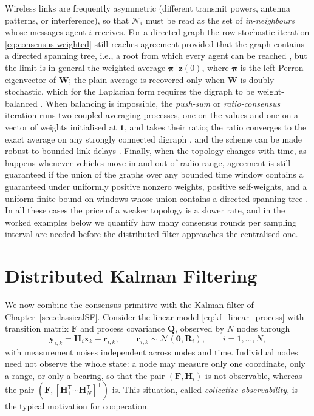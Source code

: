 \documentclass[graybox,envcountchap]{style/SNmono}
\providecommand{\DIFadd}[1]{{\protect\color{blue} #1}} %
\providecommand{\DIFdel}[1]{{\protect\color{red} #1}} %
\providecommand{\DIFaddbegin}{} %
\providecommand{\DIFaddend}{} %
\providecommand{\DIFdelbegin}{} %
\providecommand{\DIFdelend}{} %
\begin{document}
Wireless links are frequently asymmetric (different transmit powers, antenna patterns, or interference), so that $\mathcal{N}_i$ must be read as the set of \emph{in-neighbours} whose messages agent $i$ receives. For a directed graph the row-stochastic iteration \eqref{eq:consensus-weighted} still reaches agreement provided that the graph contains a directed spanning tree, i.e., a root from which every agent can be reached \cite{ren2005_consensus}, but the limit is in general the weighted average $\boldsymbol{\pi}^{\mathsf T}\mathbf{z}(0)$, where $\boldsymbol{\pi}$ is the left Perron eigenvector of $\mathbf{W}$; the plain average is recovered only when $\mathbf{W}$ is doubly stochastic, which for the Laplacian form requires the digraph to be weight-balanced \cite{olfatisaber2007_consensus}. When balancing is impossible, the \emph{push-sum} or \emph{ratio-consensus} iteration runs two coupled averaging processes, one on the values and one on a vector of weights initialised at $\mathbf{1}$, and takes their ratio; the ratio converges to the exact average on any strongly connected digraph \cite{kempe2003_gossip}, and the scheme can be made robust to bounded link delays \cite{hadjicostis2014_delays}. Finally, when the topology changes with time, as happens whenever vehicles move in and out of radio range, agreement is \DIFdelbegin \DIFdel{still guaranteed if the union of the graphs over any bounded time window contains a }\DIFdelend \DIFaddbegin \DIFadd{guaranteed under uniformly positive nonzero weights, positive self-weights, and a uniform finite bound on windows whose union contains a directed }\DIFaddend spanning tree \cite{jadbabaie2003_coordination,ren2005_consensus}. In all these cases the price of a weaker topology is a slower rate, and in the worked examples below we quantify how many consensus rounds per sampling interval are needed before the distributed filter approaches the centralised one.

\section{Distributed Kalman Filtering}
\label{sec:mas-dkf}

We now combine the consensus primitive with the Kalman filter of Chapter~\ref{sec:classicalSF}. Consider the linear model \eqref{eq:kf_linear_process} with transition matrix $\mathbf{F}$ and process covariance $\mathbf{Q}$, observed by $N$ nodes through
\begin{equation}
\mathbf{y}_{i,k}=\mathbf{H}_i\mathbf{x}_k+\mathbf{r}_{i,k},\qquad \mathbf{r}_{i,k}\sim\mathcal{N}(\mathbf{0},\mathbf{R}_i),\qquad i=1,\dots,N,
\label{eq:dkf-local-measurement}
\end{equation}
with measurement noises independent across nodes and time. Individual nodes need not observe the whole state: a node may measure only one coordinate, only a range, or only a bearing, so that the pair $(\mathbf{F},\mathbf{H}_i)$ is not observable, whereas the pair $(\mathbf{F},[\mathbf{H}_1^{\mathsf T}\cdots\mathbf{H}_N^{\mathsf T}]^{\mathsf T})$ is. This situation, called \emph{collective observability}, is the typical motivation for cooperation.
\end{document}

